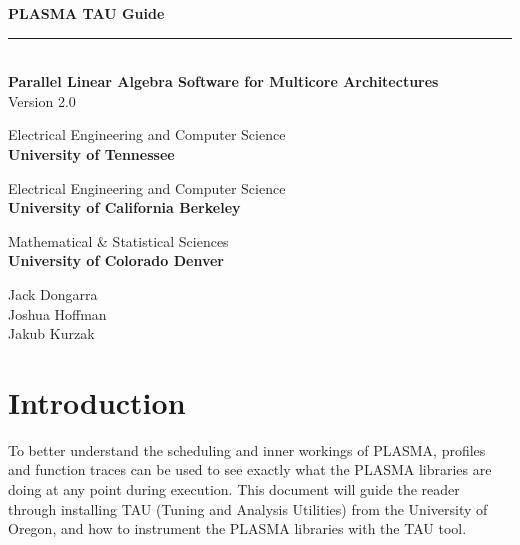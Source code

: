 \documentclass[11pt,letterpaper]{article}
\begin{document}

\thispagestyle{empty}
\begin{flushright}
\sf
\noindent
{\Huge\textbf{PLASMA TAU Guide}}
\rule[-1ex]{\textwidth}{5pt}\\[2.5ex]
{\Large\textbf{Parallel Linear Algebra Software for Multicore Architectures}} \\
\vspace{0.1in}
{\Large{Version 2.0}} \\
\vspace{0.5in}

\noindent
Electrical Engineering and Computer Science \\
\textbf{University of Tennessee}
\vspace{0.2in}

\noindent
Electrical Engineering and Computer Science \\
\textbf{University of California Berkeley}
\vspace{0.2in}

\noindent
Mathematical \& Statistical Sciences \\
\textbf{University of Colorado Denver}
\vspace{4.4in}

\noindent
Jack Dongarra \\
Joshua Hoffman \\
Jakub Kurzak
\end{flushright}


\tableofcontents
{}
\pagestyle{fancy}
\setlength\parindent{0in}
\setlength\parskip{0.1in}
\sloppy
\rm


\newpage
\section{Introduction}
\setcounter{page}{1}

To better understand the scheduling and inner workings of PLASMA, profiles and function traces can be used to see exactly what the PLASMA libraries are doing at any point during execution. This document will guide the reader through installing TAU (Tuning and Analysis Utilities) from the University of Oregon, and how to instrument the PLASMA libraries with the TAU tool.
\end{document}
